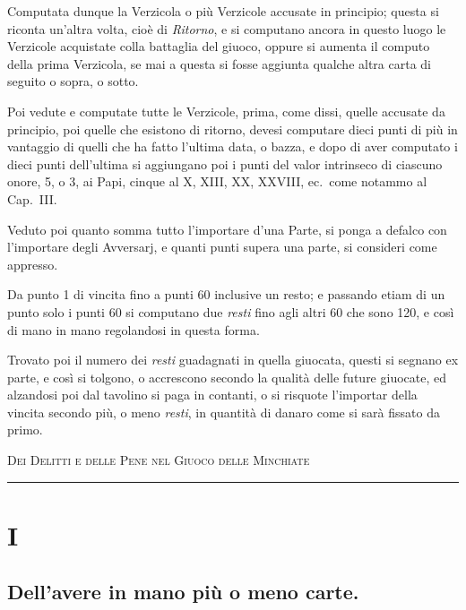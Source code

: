 \documentclass[11pt,a6paper]{article}
\newcommand{\supersection}[1]{%
\clearpage
    {\scshape \centering \huge #1\\}
    \vspace{6pt}
    \hrule
    \vspace{12pt}
}
\begin{document}
Computata dunque la Verzicola o più Verzicole accusate in principio; questa si riconta un'altra volta, cioè di \textit{Ritorno}, e si computano ancora in questo luogo le Verzicole acquistate colla battaglia del giuoco, oppure si aumenta il computo della prima Verzicola, se mai a questa si fosse aggiunta qualche altra carta di seguito o sopra, o sotto.

Poi vedute e computate tutte le Verzicole, prima, come dissi, quelle accusate da principio, poi quelle che esistono di ritorno, devesi computare dieci punti di più in vantaggio di quelli che ha fatto l'ultima data, o bazza, e dopo di
aver computato i dieci punti dell'ultima si aggiungano poi i punti del valor intrinseco di ciascuno onore, 5, o 3, ai Papi, cinque al X, XIII, XX, XXVIII, ec.\ come notammo al Cap.\ III.

Veduto poi quanto somma tutto l'importare d'una Parte, si ponga a defalco con l'importare degli Avversarj, e quanti punti supera una parte, si consideri come appresso.

Da punto 1 di vincita fino a punti 60 inclusive un resto; e passando etiam di un punto solo i punti 60 si computano due \textit{resti} fino agli altri 60 che sono 120, e così di mano in mano regolandosi in questa forma.

Trovato poi il numero dei \textit{resti} guadagnati in quella giuocata, questi si segnano ex parte, e così si tolgono, o accrescono secondo la qualità delle future giuocate, ed alzandosi poi dal tavolino si paga in contanti, o si risquote l'importar della vincita secondo più, o meno \textit{resti}, in quantità di danaro come si sarà fissato da primo.

\supersection{Dei Delitti e delle Pene nel Giuoco delle Minchiate}

\section{I}
\subsection*{Dell'avere in mano più o meno carte.}
\end{document}
